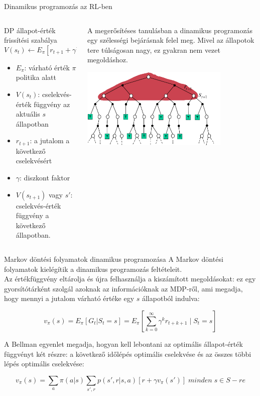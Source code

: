 \documentclass[english, aspectratio=169]{beamer}
\begin{document}
\begin{frame}{Dinamikus programozás az RL-ben}
\begin{columns}
\begin{column}{.5\textwidth}
\begin{block}{DP állapot-érték frissítési szabálya}
\[
V(s_{t})\leftarrow E_{\pi}\left[r_{t+1} + \gamma V(s_{t+1})\right]
\]
\begin{itemize}
	\item $E_{\pi}$: várható érték $\pi$ politika alatt
	\item $V(s_{t})$: cselekvés-érték függvény az aktuális $s$ állapotban
	\item $r_{t+1}$: a jutalom a következő cselekvésért
	\item $\gamma$: diszkont faktor
	\item $V(s_{t+1})$ vagy $s'$: cselekvés-érték függvény a következő állapotban.
\end{itemize}
\end{block}
\end{column}
\begin{column}{.5\textwidth}
A megerősítéses tanulásban a dinamikus programozás egy szélességi bejárásnak felel meg. Mivel az állapotok tere túlságosan nagy, ez gyakran nem vezet megoldáshoz. 
\begin{center}
\includegraphics[width=7cm, keepaspectratio]{images/solving_10}
\end{center}
\end{column}
\end{columns}
\end{frame}

\begin{frame}{Markov döntési folyamatok dinamikus programozása}
A Markov döntési folyamatok kielégítik a dinamikus programozás feltételeit.\\
Az értékfüggvény eltárolja és újra felhasználja a kiszámított megoldásokat: ez egy gyorsítótárként szolgál azoknak az információknak az MDP-ről, ami megadja, hogy mennyi a jutalom várható értéke egy $s$ állapotból indulva:
\begin{block}{}
\[
v_{\pi}(s)=E_{\pi}\left[G_{t}|S_{t}=s\right]=E_{\pi}\left[\sum_{k=0}^{\infty}\gamma^{k}r_{t+k+1}\mid S_{t}=s\right]
\]
\end{block}
A Bellman egyenlet megadja, hogyan kell lebontani az optimális állapot-érték függvényt két részre: a következő időlépés optimális cselekvése és az összes többi lépés optimális cselekvése:\\
\begin{block}{}
\[
v_{\pi}(s)=\sum_{a}\pi(a|s)\sum_{s',r}p\left(s',r|s,a\right)\left[r+\gamma v_{\pi}\left(s'\right)\right]\;minden\;s\in S-re
\]
\end{block}
\end{frame}
\end{document}

